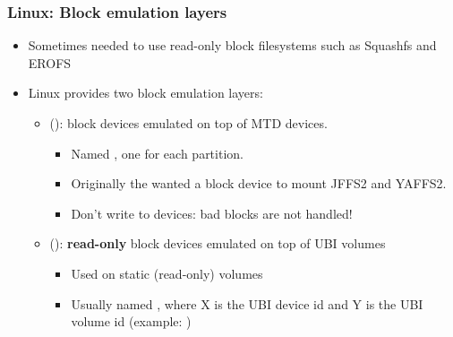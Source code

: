 \begin{frame}
  \frametitle{Linux: Block emulation layers}
  \begin{itemize}
  \item Sometimes needed to use read-only block filesystems such as Squashfs and EROFS
  \item Linux provides two block emulation layers:
    \begin{itemize}
    \item {} ():
       block devices emulated on top of MTD devices.
       \begin{itemize}
       \item Named , one for each partition.
       \item Originally the  wanted a block device to mount JFFS2 and YAFFS2.
       \item Don't write to  devices: bad blocks are not handled!
       \end{itemize}
    \item {} ():
       {\bf read-only} block devices emulated on top of UBI volumes
       \begin{itemize}
       \item Used on static (read-only) volumes
       \item Usually named , where X is the UBI device
             id and Y is the UBI volume id (example: )
       \end{itemize}
    \end{itemize}
  \end{itemize}
\end{frame}
